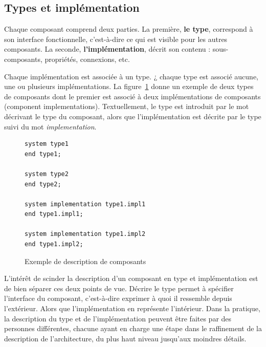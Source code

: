 \documentclass[11pt,a4paper]{paper}
\begin{document}
\begin{appendices}
\subsection{Types et implémentation}

Chaque composant comprend deux parties. La première, \textbf{le type}, correspond à son interface fonctionnelle, c'est-à-dire ce qui est visible pour les autres composants. La seconde, \textbf{l'implémentation}, décrit son contenu : sous-composants, propriétés, connexions, etc.

Chaque implémentation est associée à un type. ¿ chaque type est associé aucune, une ou plusieurs implémentations. La figure~\ref{fig:type_implementation} donne un exemple de deux types de composants dont le premier est associé à deux implémentations de composants (component implementations).  Textuellement, le type est introduit par le mot décrivant le type du composant, alors que l'implémentation est décrite par le type suivi du mot {\em implementation}.


\begin{figure}[htbp]
\begin{center}
\begin{minipage}[c]{.46\linewidth}
\begin{lstlisting}
system type1
end type1;

system type2
end type2;

system implementation type1.impl1
end type1.impl1;

system implementation type1.impl2
end type1.impl2;
\end{lstlisting}
\end{minipage}
\caption{Exemple de description de composants}
\label{fig:type_implementation}
\end{center}
\end{figure}

L'intérêt de scinder la description d'un composant en type et implémentation est de bien séparer ces deux points de vue. Décrire le type permet à spécifier l'interface du composant, c'est-à-dire exprimer à quoi il ressemble depuis l'extérieur. Alors que l'implémentation en représente l'intérieur. Dans la pratique, la description du type et de l'implémentation peuvent être faites par des personnes différentes, chacune ayant en charge une étape dans le raffinement de la description de l'architecture, du plus haut niveau jusqu'aux moindres détails.



\end{appendices}
\end{document}
